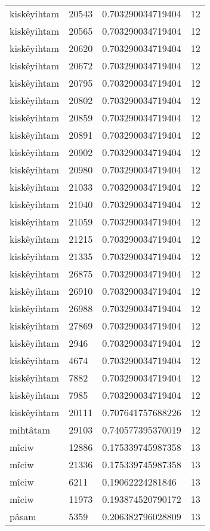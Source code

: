 \begin{longtable}{llll}
kiskêyihtam & 20543 & 0.703290034719404 & 12 \\
kiskêyihtam & 20565 & 0.703290034719404 & 12 \\
kiskêyihtam & 20620 & 0.703290034719404 & 12 \\
kiskêyihtam & 20672 & 0.703290034719404 & 12 \\
kiskêyihtam & 20795 & 0.703290034719404 & 12 \\
kiskêyihtam & 20802 & 0.703290034719404 & 12 \\
kiskêyihtam & 20859 & 0.703290034719404 & 12 \\
kiskêyihtam & 20891 & 0.703290034719404 & 12 \\
kiskêyihtam & 20902 & 0.703290034719404 & 12 \\
kiskêyihtam & 20980 & 0.703290034719404 & 12 \\
kiskêyihtam & 21033 & 0.703290034719404 & 12 \\
kiskêyihtam & 21040 & 0.703290034719404 & 12 \\
kiskêyihtam & 21059 & 0.703290034719404 & 12 \\
kiskêyihtam & 21215 & 0.703290034719404 & 12 \\
kiskêyihtam & 21335 & 0.703290034719404 & 12 \\
kiskêyihtam & 26875 & 0.703290034719404 & 12 \\
kiskêyihtam & 26910 & 0.703290034719404 & 12 \\
kiskêyihtam & 26988 & 0.703290034719404 & 12 \\
kiskêyihtam & 27869 & 0.703290034719404 & 12 \\
kiskêyihtam & 2946 & 0.703290034719404 & 12 \\
kiskêyihtam & 4674 & 0.703290034719404 & 12 \\
kiskêyihtam & 7882 & 0.703290034719404 & 12 \\
kiskêyihtam & 7985 & 0.703290034719404 & 12 \\
kiskêyihtam & 20111 & 0.707641757688226 & 12 \\
mihtâtam & 29103 & 0.740577395370019 & 12 \\
mîciw & 12886 & 0.175339745987358 & 13 \\
mîciw & 21336 & 0.175339745987358 & 13 \\
mîciw & 6211 & 0.19062224281846 & 13 \\
mîciw & 11973 & 0.193874520790172 & 13 \\
pâsam & 5359 & 0.206382796028809 & 13 \\

\end{longtable}
